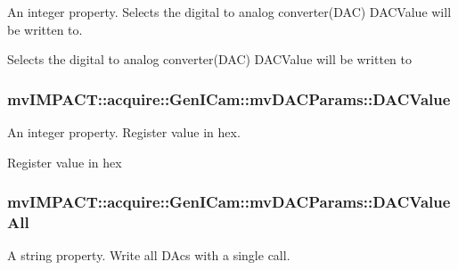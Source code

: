 An integer property. Selects the digital to analog converter(\+D\+A\+C) D\+A\+C\+Value will be written to. 

Selects the digital to analog converter(\+D\+A\+C) D\+A\+C\+Value will be written to \hypertarget{classmv_i_m_p_a_c_t_1_1acquire_1_1_gen_i_cam_1_1mv_d_a_c_params_aaa35076aa820db48a49a66f6ce36d286}{
\subsubsection[{D\+A\+C\+Value}]{ mv\+I\+M\+P\+A\+C\+T\+::acquire\+::\+Gen\+I\+Cam\+::mv\+D\+A\+C\+Params\+::\+D\+A\+C\+Value}}\label{classmv_i_m_p_a_c_t_1_1acquire_1_1_gen_i_cam_1_1mv_d_a_c_params_aaa35076aa820db48a49a66f6ce36d286}


An integer property. Register value in hex. 

Register value in hex \hypertarget{classmv_i_m_p_a_c_t_1_1acquire_1_1_gen_i_cam_1_1mv_d_a_c_params_a91bf5b56ea7b94c43455546d427b9e12}{
\subsubsection[{D\+A\+C\+Value\+All}]{ mv\+I\+M\+P\+A\+C\+T\+::acquire\+::\+Gen\+I\+Cam\+::mv\+D\+A\+C\+Params\+::\+D\+A\+C\+Value\+All}}\label{classmv_i_m_p_a_c_t_1_1acquire_1_1_gen_i_cam_1_1mv_d_a_c_params_a91bf5b56ea7b94c43455546d427b9e12}


A string property. Write all D\+Acs with a single call. 

